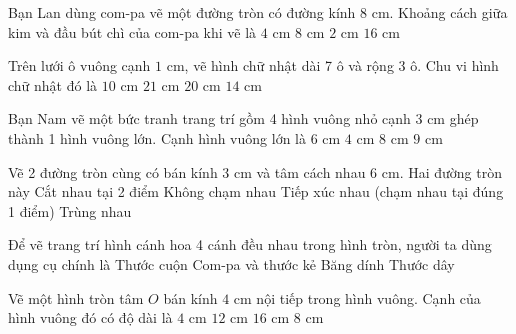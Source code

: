 \begin{ex} %
Bạn Lan dùng com-pa vẽ một đường tròn có đường kính $8\text{ cm}$. Khoảng cách giữa kim và đầu bút chì của com-pa khi vẽ là
\choice
{\True $4\text{ cm}$}
{$8\text{ cm}$}
{$2\text{ cm}$}
{$16\text{ cm}$}
\end{ex}

\begin{ex} %
Trên lưới ô vuông cạnh $1\text{ cm}$, vẽ hình chữ nhật dài 7 ô và rộng 3 ô. Chu vi hình chữ nhật đó là
\choice
{$10\text{ cm}$}
{$21\text{ cm}$}
{\True $20\text{ cm}$}
{$14\text{ cm}$}
\end{ex}

\begin{ex} %
Bạn Nam vẽ một bức tranh trang trí gồm 4 hình vuông nhỏ cạnh $3\text{ cm}$ ghép thành 1 hình vuông lớn. Cạnh hình vuông lớn là
\choice
{\True $6\text{ cm}$}
{$4\text{ cm}$}
{$8\text{ cm}$}
{$9\text{ cm}$}
\end{ex}

\begin{ex} %
Vẽ 2 đường tròn cùng có bán kính $3\text{ cm}$ và tâm cách nhau $6\text{ cm}$. Hai đường tròn này
\choice
{Cắt nhau tại 2 điểm}
{Không chạm nhau}
{\True Tiếp xúc nhau (chạm nhau tại đúng 1 điểm)}
{Trùng nhau}
\end{ex}

\begin{ex} %
Để vẽ trang trí hình cánh hoa 4 cánh đều nhau trong hình tròn, người ta dùng dụng cụ chính là
\choice
{Thước cuộn}
{\True Com-pa và thước kẻ}
{Băng dính}
{Thước dây}
\end{ex}

\begin{ex} %
Vẽ một hình tròn tâm $O$ bán kính $4\text{ cm}$ nội tiếp trong hình vuông. Cạnh của hình vuông đó có độ dài là
\choice
{$4\text{ cm}$}
{$12\text{ cm}$}
{$16\text{ cm}$}
{\True $8\text{ cm}$}
\end{ex}

